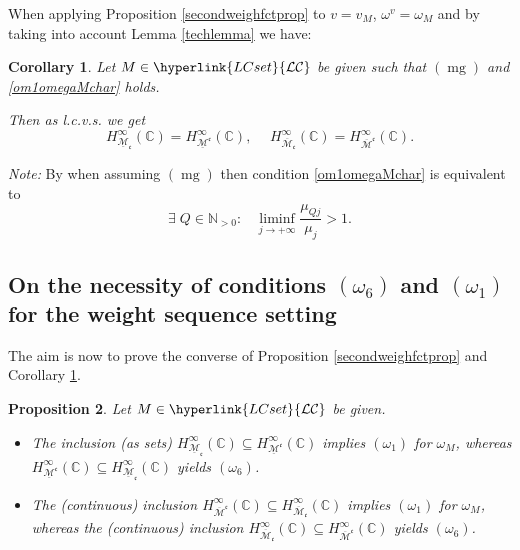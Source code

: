 \documentclass[10pt]{amsart}%
\numberwithin{equation}{section}
\theoremstyle{plain}
\newtheorem{proposition}{Proposition}[section]
\newtheorem{corollary}[proposition]{Corollary}
\newcommand{\CC}{\mathbb{C}}
\newcommand{\NN}{\mathbb{N}}
\let\on=\operatorname
\begin{document}
When applying Proposition \ref{secondweighfctprop} to $v=v_M$, $\omega^v=\omega_M$ and by taking into account Lemma \ref{techlemma} we have:

\begin{corollary}\label{secondweighfctpropcor}
Let $M\in\hyperlink{LCset}{\mathcal{LC}}$ be given such that \hyperlink{mg}{$(\on{mg})$} and \eqref{om1omegaMchar} holds.

Then as l.c.v.s. we get
$$H^{\infty}_{\underline{\mathcal{M}}_{\mathfrak{c}}}(\CC)=H^{\infty}_{\underline{\mathcal{M}}^{\mathfrak{c}}}(\CC),\hspace{15pt}H^{\infty}_{\overline{\mathcal{M}}_{\mathfrak{c}}}(\CC)=H^{\infty}_{\overline{\mathcal{M}}^{\mathfrak{c}}}(\CC).$$
\end{corollary}
{\itshape Note:} By \cite[Prop. 3.4]{subaddlike} when assuming \hyperlink{mg}{$(\on{mg})$} then condition \eqref{om1omegaMchar} is equivalent to
$$\exists\;Q\in\NN_{>0}:\;\;\;\liminf_{j\rightarrow+\infty}\frac{\mu_{Qj}}{\mu_j}>1.$$

\subsection{On the necessity of conditions $(\omega_6)$ and $(\omega_1)$ for the weight sequence setting}\label{necsectionweightsequ}
The aim is now to prove the converse of Proposition \ref{secondweighfctprop} and Corollary \ref{secondweighfctpropcor}.

\begin{proposition}\label{secondweighfctpropconv}
Let $M\in\hyperlink{LCset}{\mathcal{LC}}$ be given.
\begin{itemize}
\item[$(i)$] The inclusion (as sets) $H^{\infty}_{\underline{\mathcal{M}}_{\mathfrak{c}}}(\CC)\subseteq H^{\infty}_{\underline{\mathcal{M}}^{\mathfrak{c}}}(\CC)$ implies \hyperlink{om1}{$(\omega_1)$} for $\omega_M$, whereas $H^{\infty}_{\underline{\mathcal{M}}^{\mathfrak{c}}}(\CC)\subseteq H^{\infty}_{\underline{\mathcal{M}}_{\mathfrak{c}}}(\CC)$ yields \hyperlink{om6}{$(\omega_6)$}.

\item[$(ii)$] The (continuous) inclusion $H^{\infty}_{\overline{\mathcal{M}}^{\mathfrak{c}}}(\CC)\subseteq H^{\infty}_{\overline{\mathcal{M}}_{\mathfrak{c}}}(\CC)$ implies \hyperlink{om1}{$(\omega_1)$} for $\omega_M$, whereas the (continuous) inclusion $H^{\infty}_{\overline{\mathcal{M}}_{\mathfrak{c}}}(\CC)\subseteq H^{\infty}_{\overline{\mathcal{M}}^{\mathfrak{c}}}(\CC)$ yields \hyperlink{om6}{$(\omega_6)$}.
\end{itemize}
\end{proposition}
\end{document}
